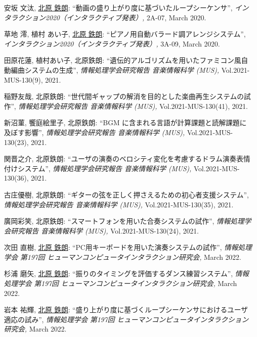 \begin{Enumerate}
\item 
安坂 文汰, 
\underline{北原 鉄朗}: 
    ``動画の盛り上がり度に基づいたループシーケンサ'', 
    {\it インタラクション2020（インタラクティブ発表）,
    } 2A-07, March 2020. 

\item 
草地 澪, 
植村 あい子, 
\underline{北原 鉄朗}: 
    ``ピアノ用自動バラード調アレンジシステム'', 
    {\it インタラクション2020（インタラクティブ発表）,
    } 3A-09, March 2020. 

\item 
田原花蓮, 
植村あい子, 
北原鉄朗: 
    ``遺伝的アルゴリズムを用いたファミコン風自動編曲システムの生成'', 
    {\it 情報処理学会研究報告 音楽情報科学 (MUS),
    } Vol.2021-MUS-130(9), 2021. 

\item 
稲野友哉, 
北原鉄朗: 
    ``世代間ギャップの解消を目的とした楽曲再生システムの試作'', 
    {\it 情報処理学会研究報告 音楽情報科学 (MUS),
    } Vol.2021-MUS-130(41), 2021. 

\item 
新沼菫, 
饗庭絵里子, 
北原鉄朗: 
    ``BGM に含まれる言語が計算課題と読解課題に及ぼす影響'', 
    {\it 情報処理学会研究報告 音楽情報科学 (MUS),
    } Vol.2021-MUS-130(23), 2021. 

\item 
関晋之介, 
北原鉄朗: 
    ``ユーザの演奏のベロシティ変化を考慮するドラム演奏表情付けシステム'', 
    {\it 情報処理学会研究報告 音楽情報科学 (MUS),
    } Vol.2021-MUS-130(36), 2021. 

\item 
古庄優樹, 
北原鉄朗: 
    ``ギターの弦を正しく押さえるための初心者支援システム'', 
    {\it 情報処理学会研究報告 音楽情報科学 (MUS),
    } Vol.2021-MUS-130(35), 2021. 

\item 
廣岡彩笑, 
北原鉄朗: 
    ``スマートフォンを用いた合奏システムの試作'', 
    {\it 情報処理学会研究報告 音楽情報科学 (MUS),
    } Vol.2021-MUS-130(24), 2021. 

\item 
次田 直樹, 
\underline{北原 鉄朗}: 
    ``PC用キーボードを用いた演奏システムの試作'', 
    {\it 情報処理学会 第197回 ヒューマンコンピュータインタラクション研究会,
    } March 2022. 

\item 
杉浦 磨矢, 
\underline{北原 鉄朗}: 
    ``振りのタイミングを評価するダンス練習システム'', 
    {\it 情報処理学会 第197回 ヒューマンコンピュータインタラクション研究会,
    } March 2022. 

\item 
岩本 祐輝, 
\underline{北原 鉄朗}: 
    ``盛り上がり度に基づくループシーケンサにおけるユーザ適応の試み'', 
    {\it 情報処理学会 第197回 ヒューマンコンピュータインタラクション研究会,
    } March 2022. 

\end{Enumerate}

